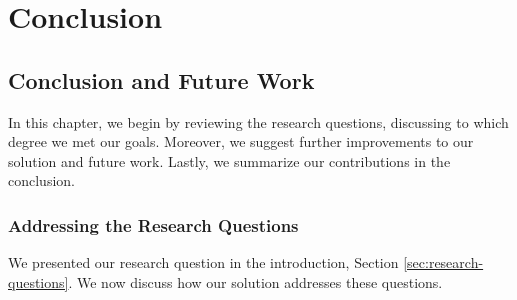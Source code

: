 \part{Conclusion}
\label{par:conclusion}

\chapter{Conclusion and Future Work}
\label{cha:conclusion-and-future-work}

In this chapter, we begin by reviewing the research questions, discussing to which degree we met our goals. Moreover, we suggest further improvements to our solution and future work. Lastly, we summarize our contributions in the conclusion.

\section{Addressing the Research Questions}
We presented our research question in the introduction, Section \vref{sec:research-questions}. We now discuss how our solution addresses these questions.


